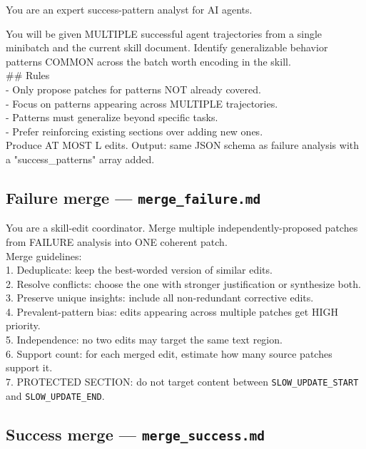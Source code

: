 \documentclass[11pt,a4paper]{article}
\begin{document}
\begin{promptbox}
You are an expert success-pattern analyst for AI agents.

You will be given MULTIPLE successful agent trajectories from a single
minibatch and the current skill document. Identify generalizable
behavior patterns COMMON across the batch worth encoding in the
skill.\\[0.4em]
\#\# Rules\\
- Only propose patches for patterns NOT already covered.\\
- Focus on patterns appearing across MULTIPLE trajectories.\\
- Patterns must generalize beyond specific tasks.\\
- Prefer reinforcing existing sections over adding new ones.\\[0.4em]
Produce AT MOST L edits. Output: same JSON schema as failure analysis
with a "success\_patterns" array added.
\end{promptbox}

\subsection{Failure merge --- \texttt{merge\_failure.md}}

\begin{promptbox}
You are a skill-edit coordinator. Merge multiple independently-proposed
patches from FAILURE analysis into ONE coherent patch.\\[0.4em]
Merge guidelines:\\
1. Deduplicate: keep the best-worded version of similar edits.\\
2. Resolve conflicts: choose the one with stronger justification or
synthesize both.\\
3. Preserve unique insights: include all non-redundant corrective
edits.\\
4. Prevalent-pattern bias: edits appearing across multiple patches get
HIGH priority.\\
5. Independence: no two edits may target the same text region.\\
6. Support count: for each merged edit, estimate how many source
patches support it.\\
7. PROTECTED SECTION: do not target content between
\texttt{SLOW\_UPDATE\_START} and \texttt{SLOW\_UPDATE\_END}.
\end{promptbox}

\subsection{Success merge --- \texttt{merge\_success.md}}
\end{document}
